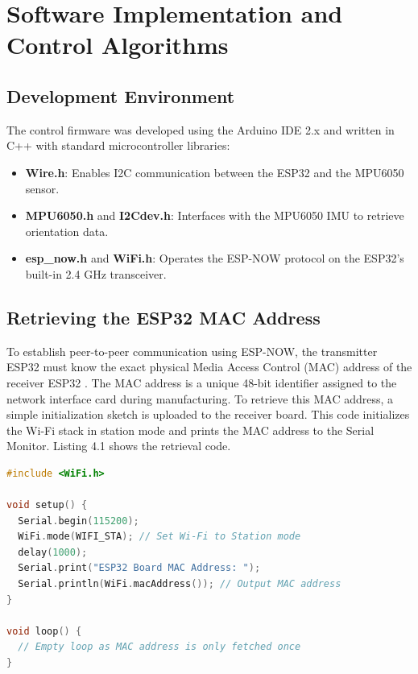 \documentclass[12pt,a4paper,oneside]{report}
\begin{document}
\chapter{Software Implementation and Control Algorithms}
\section{Development Environment}
\label{sec:dev_env}
The control firmware was developed using the Arduino IDE 2.x and written in C++ with standard microcontroller libraries:
\begin{itemize}[noitemsep,topsep=2pt,parsep=0pt,partopsep=0pt]
    \item \textbf{Wire.h}: Enables I2C communication between the ESP32 and the MPU6050 sensor.
    \item \textbf{MPU6050.h} and \textbf{I2Cdev.h}: Interfaces with the MPU6050 IMU to retrieve orientation data.
    \item \textbf{esp\_now.h} and \textbf{WiFi.h}: Operates the ESP-NOW protocol on the ESP32's built-in 2.4 GHz transceiver.
\end{itemize}

\section{Retrieving the ESP32 MAC Address}
To establish peer-to-peer communication using ESP-NOW, the transmitter ESP32 must know the exact physical Media Access Control (MAC) address of the receiver ESP32 \cite{espnow_ref}. The MAC address is a unique 48-bit identifier assigned to the network interface card during manufacturing. To retrieve this MAC address, a simple initialization sketch is uploaded to the receiver board. This code initializes the Wi-Fi stack in station mode and prints the MAC address to the Serial Monitor. Listing 4.1 shows the retrieval code.
\begin{lstlisting}[language=C++, caption={ESP32 MAC Address Fetching Sketch}]
#include <WiFi.h>

void setup() {
  Serial.begin(115200);
  WiFi.mode(WIFI_STA); // Set Wi-Fi to Station mode
  delay(1000);
  Serial.print("ESP32 Board MAC Address: ");
  Serial.println(WiFi.macAddress()); // Output MAC address
}

void loop() {
  // Empty loop as MAC address is only fetched once
}
\end{lstlisting}
\end{document}
